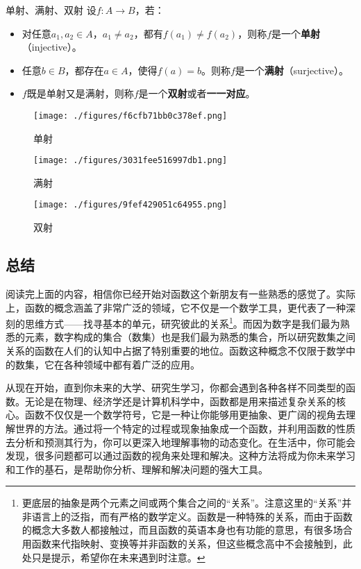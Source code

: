 \begin{definition}{单射、满射、双射}
设$f:A\to{B}$，若：
\begin{itemize}
\item 对任意$a_1,a_2\in{A}$，$a_1\not={a_2}$，都有$f(a_1)\not={f(a_2)}$，则称$f$是一个\textbf{单射}（injective）。
\item 任意$b\in{B}$，都存在$a\in{A}$，使得$f(a)=b$。则称$f$是一个\textbf{满射}（surjective）。
\item $f$既是单射又是满射，则称$f$是一个\textbf{双射}或者\textbf{一一对应}。
\end{itemize}
\end{definition}

\begin{figure}[ht]
\centering
\texttt{[image: ./figures/f6cfb71bb0c378ef.png]}
\caption{单射}\label{fig_functi_2}
\end{figure}
\begin{figure}[ht]
\centering
\texttt{[image: ./figures/3031fee516997db1.png]}
\caption{满射} \label{fig_functi_3}
\end{figure}
\begin{figure}[ht]
\centering
\texttt{[image: ./figures/9fef429051c64955.png]}
\caption{双射} \label{fig_functi_4}
\end{figure}
\subsection{总结}

阅读完上面的内容，相信你已经开始对函数这个新朋友有一些熟悉的感觉了。实际上，函数的概念涵盖了非常广泛的领域，它不仅是一个数学工具，更代表了一种深刻的思维方式——找寻基本的单元，研究彼此的关系\footnote{更底层的抽象是两个元素之间或两个集合之间的“关系”。注意这里的“关系”并非语言上的泛指，而有严格的数学定义。函数是一种特殊的关系，而由于函数的概念大多数人都接触过，而且函数的英语本身也有功能的意思，有很多场合用函数来代指映射、变换等并非函数的关系，但这些概念高中不会接触到，此处只是提示，希望你在未来遇到时注意。}。而因为数字是我们最为熟悉的元素，数字构成的集合（数集）也是我们最为熟悉的集合，所以研究数集之间关系的函数在人们的认知中占据了特别重要的地位。函数这种概念不仅限于数学中的数集，它在各种领域中都有着广泛的应用。

从现在开始，直到你未来的大学、研究生学习，你都会遇到各种各样不同类型的函数。无论是在物理、经济学还是计算机科学中，函数都是用来描述复杂关系的核心。函数不仅仅是一个数学符号，它是一种让你能够用更抽象、更广阔的视角去理解世界的方法。通过将一个特定的过程或现象抽象成一个函数，并利用函数的性质去分析和预测其行为，你可以更深入地理解事物的动态变化。在生活中，你可能会发现，很多问题都可以通过函数的视角来处理和解决。这种方法将成为你未来学习和工作的基石，是帮助你分析、理解和解决问题的强大工具。
